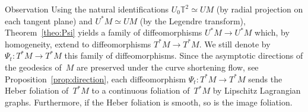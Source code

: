 \documentclass[AHL,Unicode,longabstracts,published]{cedram}
\newcommand{\T}{\mathbb{T}}
\begin{document}
\begin{enonce}
{Observation } \label{obs:foliation-deformation}
Using the natural identifications $U_0\T^2 \simeq UM$ (by radial projection on each tangent plane) and $U^*M \simeq UM$ (by the Legendre transform), Theorem~\ref{theo:Psi} yields a family of diffeomorphisms $U^*M \to U^*M$ which, by homogeneity, extend to diffeomorphisms $T^*M \to T^*M$. We still denote by $\Psi_t:T^*M \to T^*M$ this family of diffeomorphisms. Since the asymptotic directions of the geodesics of~$M$ are preserved under the curve shortening flow, see Proposition~\ref{prop:direction}, each diffeomorphism $\Psi_t:T^*M \to T^*M$ sends the Heber foliation of~$T^*M$ to a continuous foliation of~$T^*M$ by Lipschitz Lagrangian graphs. Furthermore, if the Heber foliation is smooth, so is the image foliation.
\end{enonce}
\end{document}
